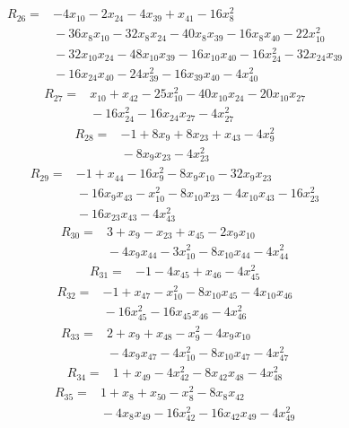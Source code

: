 \documentclass[11pt]{article}
\theoremstyle{definition}
\theoremstyle{remark}
\begin{document}
\begin{align*}
R_{26} ={}& -4x_{10} - 2x_{24} - 4x_{39} + x_{41} - 16x_{8}^{2} \\
&{} -36x_{8} x_{10} - 32x_{8} x_{24} - 40x_{8} x_{39} - 16x_{8} x_{40} - 22x_{10}^{2} \\
&{} -32x_{10} x_{24} - 48x_{10} x_{39} - 16x_{10} x_{40} - 16x_{24}^{2} - 32x_{24} x_{39} \\
&{} -16x_{24} x_{40} - 24x_{39}^{2} - 16x_{39} x_{40} - 4x_{40}^{2}
\end{align*}
\begin{align*}
R_{27} ={}& x_{10} + x_{42} - 25x_{10}^{2} - 40x_{10} x_{24} - 20x_{10} x_{27} \\
&{} -16x_{24}^{2} - 16x_{24} x_{27} - 4x_{27}^{2}
\end{align*}
\begin{align*}
R_{28} ={}& -1 + 8x_{9} + 8x_{23} + x_{43} - 4x_{9}^{2} \\
&{} -8x_{9} x_{23} - 4x_{23}^{2}
\end{align*}
\begin{align*}
R_{29} ={}& -1 + x_{44} - 16x_{9}^{2} - 8x_{9} x_{10} - 32x_{9} x_{23} \\
&{} -16x_{9} x_{43} - x_{10}^{2} - 8x_{10} x_{23} - 4x_{10} x_{43} - 16x_{23}^{2} \\
&{} -16x_{23} x_{43} - 4x_{43}^{2}
\end{align*}
\begin{align*}
R_{30} ={}& 3 + x_{9} - x_{23} + x_{45} - 2x_{9} x_{10} \\
&{} -4x_{9} x_{44} - 3x_{10}^{2} - 8x_{10} x_{44} - 4x_{44}^{2}
\end{align*}
\begin{align*}
R_{31} ={}& -1 - 4x_{45} + x_{46} - 4x_{45}^{2}
\end{align*}
\begin{align*}
R_{32} ={}& -1 + x_{47} - x_{10}^{2} - 8x_{10} x_{45} - 4x_{10} x_{46} \\
&{} -16x_{45}^{2} - 16x_{45} x_{46} - 4x_{46}^{2}
\end{align*}
\begin{align*}
R_{33} ={}& 2 + x_{9} + x_{48} - x_{9}^{2} - 4x_{9} x_{10} \\
&{} -4x_{9} x_{47} - 4x_{10}^{2} - 8x_{10} x_{47} - 4x_{47}^{2}
\end{align*}
\begin{align*}
R_{34} ={}& 1 + x_{49} - 4x_{42}^{2} - 8x_{42} x_{48} - 4x_{48}^{2}
\end{align*}
\begin{align*}
R_{35} ={}& 1 + x_{8} + x_{50} - x_{8}^{2} - 8x_{8} x_{42} \\
&{} -4x_{8} x_{49} - 16x_{42}^{2} - 16x_{42} x_{49} - 4x_{49}^{2}
\end{align*}
\end{document}
